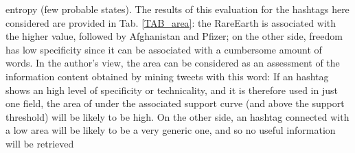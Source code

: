 \documentclass[12pt,%
               a4paper,%
               oneside,openany,%
               titlepage,%
               headinclude,footinclude,%
               BCOR5mm,%
               cleardoublepage=empty,%
               tablecaptionabove,%
               floatperchapter,
               ]{scrreprt}                 %
\begin{document}
entropy (few probable states). The results of this evaluation for the hashtags here considered are provided in Tab. \ref{TAB_area}: the RareEarth is associated with the higher value, followed by Afghanistan and Pfizer; on the other side, freedom has low specificity since it can be associated with a cumbersome amount of words. In the author's view, the area can be considered as an assessment of the information content obtained by mining tweets with this word: If an hashtag shows an high level of specificity or technicality, and it is therefore used in just one field, the area of under the associated support curve (and above the support threshold) will be likely to be high. On the other side, an hashtag connected with a low area will be likely to be a very generic one, and so no useful information will be retrieved
\end{document}
